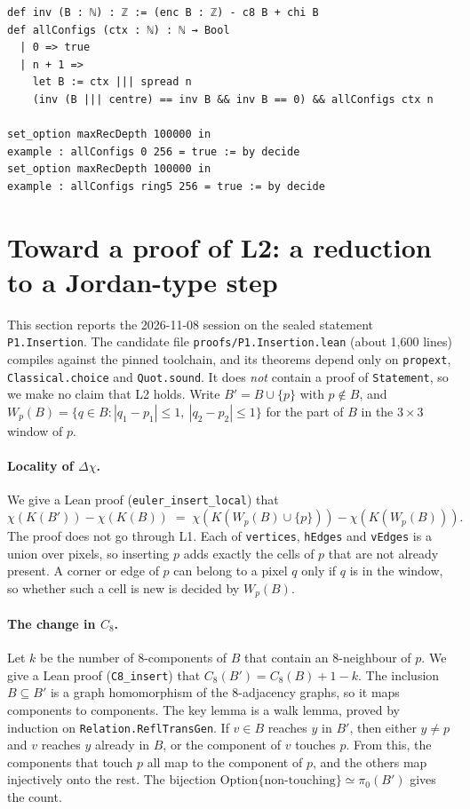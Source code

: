 \documentclass[11pt]{article}
\theoremstyle{definition}
\theoremstyle{remark}
\begin{document}
\begin{lstlisting}[caption={The exhaustive configuration check (excerpt from the \texttt{Mask} namespace).},label={lst:mask}]
def inv (B : ℕ) : ℤ := (enc B : ℤ) - c8 B + chi B
def allConfigs (ctx : ℕ) : ℕ → Bool
  | 0 => true
  | n + 1 =>
    let B := ctx ||| spread n
    (inv (B ||| centre) == inv B && inv B == 0) && allConfigs ctx n

set_option maxRecDepth 100000 in
example : allConfigs 0 256 = true := by decide
set_option maxRecDepth 100000 in
example : allConfigs ring5 256 = true := by decide
\end{lstlisting}

\section{Toward a proof of L2: a reduction to a Jordan-type step}\label{sec:reduction}

This section reports the 2026-11-08 session on the sealed statement
\texttt{P1.Insertion}. The candidate file \texttt{proofs/P1.Insertion.lean} (about
1{,}600 lines) compiles against the pinned toolchain, and its theorems depend only on
\texttt{propext}, \texttt{Classical.choice} and \texttt{Quot.sound}. It does
\emph{not} contain a proof of \texttt{Statement}, so we make no claim that L2
holds. Write $B' = B\cup\{p\}$ with $p\notin B$, and
$W_p(B) = \{q\in B : |q_1-p_1|\le1,\ |q_2-p_2|\le1\}$ for the part of $B$ in the
$3\times3$ window of $p$.

\paragraph{Locality of $\Delta\chi$.} We give a Lean proof (\texttt{euler\_insert\_local}) that
\[
  \chi(K(B')) - \chi(K(B)) \;=\; \chi(K(W_p(B)\cup\{p\})) - \chi(K(W_p(B))).
\]
The proof does not go through L1. Each of \texttt{vertices}, \texttt{hEdges} and
\texttt{vEdges} is a union over pixels, so inserting $p$ adds exactly the cells of
$p$ that are not already present. A corner or edge of $p$ can belong to a pixel $q$
only if $q$ is in the window, so whether such a cell is new is decided by $W_p(B)$.

\paragraph{The change in $C_8$.} Let $k$ be the number of 8-components of $B$ that
contain an 8-neighbour of $p$. We give a Lean proof (\texttt{C8\_insert}) that
$C_8(B') = C_8(B) + 1 - k$. The inclusion $B\subseteq B'$ is a graph homomorphism of the
8-adjacency graphs, so it maps components to components. The key lemma is a walk
lemma, proved by induction on \texttt{Relation.ReflTransGen}. If $v\in B$ reaches
$y$ in $B'$, then either $y\ne p$ and $v$ reaches $y$ already in $B$, or the component
of $v$ touches $p$. From this, the components that touch $p$ all map to the
component of $p$, and the others map injectively onto the rest. The bijection
$\mathrm{Option}\{\text{non-touching}\}\simeq \pi_0(B')$ gives the count.
\end{document}
